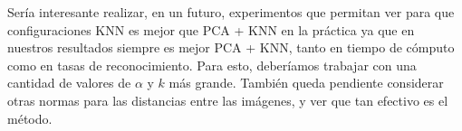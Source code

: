 Sería interesante realizar, en un futuro, experimentos que permitan ver para que configuraciones KNN es mejor que PCA + KNN en la práctica ya que en nuestros resultados siempre es mejor PCA + KNN, tanto en tiempo de cómputo como en tasas de reconocimiento. Para esto, deberíamos trabajar con una cantidad de valores de $\alpha$ y $k$ más grande. También queda pendiente considerar otras normas para las distancias entre las imágenes, y ver que tan efectivo es el método. 

